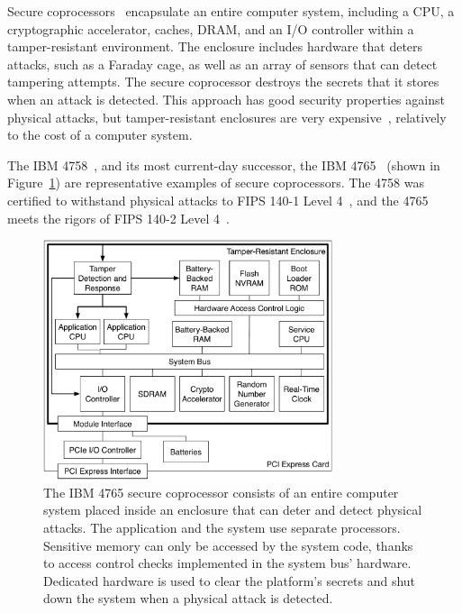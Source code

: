 \label{sec:sgx_related_ibm4765}

Secure coprocessors~\cite{yee1994coprocessors} encapsulate an entire computer
system, including a CPU, a cryptographic accelerator, caches, DRAM, and an I/O
controller within a tamper-resistant environment. The enclosure includes
hardware that deters attacks, such as a Faraday cage, as well as an array of
sensors that can detect tampering attempts. The secure coprocessor destroys the
secrets that it stores when an attack is detected. This approach has good
security properties against physical attacks, but tamper-resistant enclosures
are very expensive~\cite{anderson2001security}, relatively to the cost of a
computer system.

The IBM 4758~\cite{smith1999ibm4758}, and its most current-day successor, the
IBM 4765~\cite{nist2015ibm4765} (shown in Figure~\ref{fig:ibm_4765}) are
representative examples of secure coprocessors. The 4758 was certified to
withstand physical attacks to FIPS 140-1 Level 4~\cite{smith1999validating},
and the 4765 meets the rigors of FIPS 140-2 Level 4~\cite{nist2011fipscert}.

\begin{figure}[hbt]
  \centering
  \includegraphics[width=85mm]{figures/ibm_4765.pdf}
  \caption{
    The IBM 4765 secure coprocessor consists of an entire computer system
    placed inside an enclosure that can deter and detect physical attacks.
    The application and the system use separate processors. Sensitive memory
    can only be accessed by the system code, thanks to access control checks
    implemented in the system bus' hardware. Dedicated hardware is used to clear
    the platform's secrets and shut down the system when a physical attack is
    detected.
  }
  \label{fig:ibm_4765}
\end{figure}

